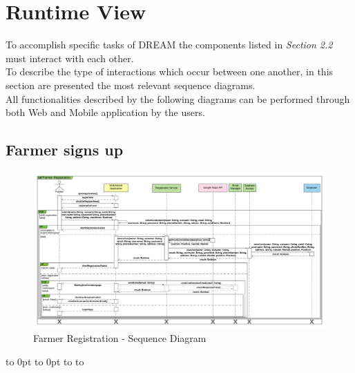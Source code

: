 \section{Runtime View}

To accomplish specific tasks of DREAM the components listed in \textit{Section 2.2} must interact with each other.\\
To describe the type of interactions which occur between one another, in this section are presented the most relevant sequence diagrams.\\

All functionalities described by the following diagrams can be performed through both Web and Mobile application by the users. 


\def\fillandplacepagenumber{%
 \par\pagestyle{empty}%
\vbox to 0pt{\vss}\vfill
\vbox to 0pt{\baselineskip0pt
   \hbox to\linewidth{\hss}%
   \setlength{\footskip}{70pt}
   \baselineskip\footskip
   \hbox to\linewidth{%
     \hfil\thepage\hfil}\vss}}

\subsection{Farmer signs up}

\newpage
\begin{landscape}
\begin{figure}[h]
\vspace*{-2cm}
\noindent
\centering
\centerline{\includegraphics[scale= 0.108]{./Images/Sequence diagram/Farmer Registration Sequence Diagram.png}}
    \caption{Farmer Registration - Sequence Diagram}
    \vspace*{-12cm}
\end{figure}
\fillandplacepagenumber
\end{landscape}

